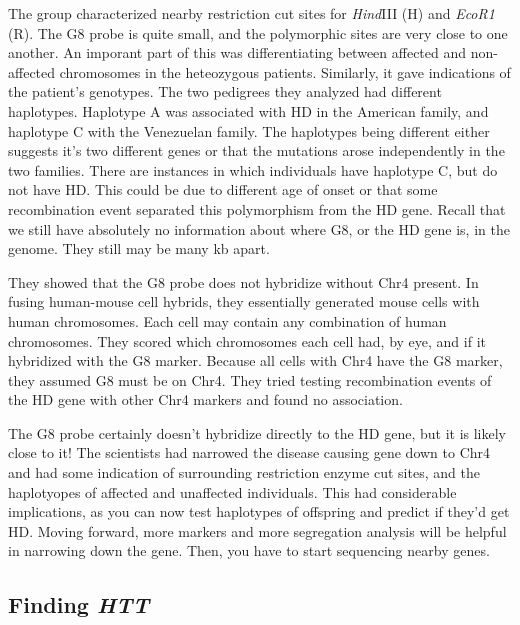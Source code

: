 The group characterized nearby restriction cut sites for \textit{Hind}III (H) and \textit{EcoR1} (R). The G8 probe is quite small, and the polymorphic sites are very close to one another. An imporant part of this was differentiating between  affected and non-affected chromosomes in the heteozygous patients. Similarly, it gave indications of the patient's genotypes. The two pedigrees they analyzed had different haplotypes. Haplotype A was associated with HD in the American family, and haplotype C with the Venezuelan family. The haplotypes being different either suggests it's two different genes or that the mutations arose independently in the two families. There are instances in which individuals have haplotype C, but do not have HD. This could be due to different age of onset or that some recombination event separated this polymorphism from the HD gene. Recall that we still have absolutely no information about where G8, or the HD gene is, in the genome. They still may be many kb apart. \newline

They showed that the G8 probe does not hybridize without Chr4 present. In fusing human-mouse cell hybrids, they essentially generated mouse cells with human chromosomes. Each cell may contain any combination of human chromosomes. They scored which chromosomes each cell had, by eye, and if it hybridized with the G8 marker. Because all cells with Chr4 have the G8 marker, they assumed G8 must be on Chr4. They tried testing recombination events of the HD gene with other Chr4 markers and found no association.\newline

The G8 probe certainly doesn't hybridize directly to the HD gene, but it is likely close to it! The scientists had narrowed the disease causing gene down to Chr4 and had some indication of surrounding restriction enzyme cut sites, and the haplotyopes of affected and unaffected individuals. This had considerable implications, as you can now test haplotypes of offspring and predict if they'd get HD. Moving forward, more markers and more segregation analysis will be helpful in narrowing down the gene. Then, you have to start sequencing nearby genes.  

\subsection*{Finding \textit{HTT}}

